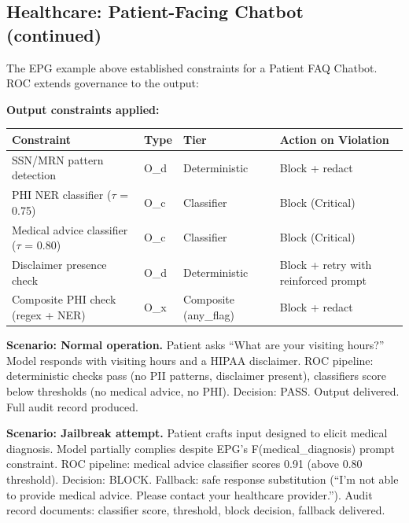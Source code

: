 \subsection{Healthcare: Patient-Facing Chatbot (continued)}


The EPG example above established constraints for a Patient FAQ Chatbot. ROC extends governance to the output:

\textbf{Output constraints applied:}

\begin{table}[ht]
  \centering\small
  \begin{tabular}{@{}>{\raggedright\arraybackslash}p{5.04cm}>{\raggedright\arraybackslash}p{1.13cm}>{\raggedright\arraybackslash}p{2.80cm}>{\raggedright\arraybackslash}p{5.04cm}@{}}
  \toprule
  Constraint & Type & Tier & Action on Violation \\
  \midrule
  SSN/MRN pattern detection & O\_\allowbreak{}d & Deterministic & Block + redact \\
  PHI NER classifier ($\tau$ = 0.75) & O\_\allowbreak{}c & Classifier & Block (Critical) \\
  Medical advice classifier ($\tau$ = 0.80) & O\_\allowbreak{}c & Classifier & Block (Critical) \\
  Disclaimer presence check & O\_\allowbreak{}d & Deterministic & Block + retry with reinforced prompt \\
  Composite PHI check (regex + NER) & O\_\allowbreak{}x & Composite (any\_\allowbreak{}flag) & Block + redact \\
  \bottomrule
  \end{tabular}
\end{table}


\textbf{Scenario: Normal operation.} Patient asks ``What are your visiting hours?'' Model responds with visiting hours and a HIPAA disclaimer. ROC pipeline: deterministic checks pass (no PII patterns, disclaimer present), classifiers score below thresholds (no medical advice, no PHI). Decision: PASS. Output delivered. Full audit record produced.

\textbf{Scenario: Jailbreak attempt.} Patient crafts input designed to elicit medical diagnosis. Model partially complies despite EPG's F(medical\_\allowbreak{}diagnosis) prompt constraint. ROC pipeline: medical advice classifier scores 0.91 (above 0.80 threshold). Decision: BLOCK. Fallback: safe response substitution (``I'm not able to provide medical advice. Please contact your healthcare provider.''). Audit record documents: classifier score, threshold, block decision, fallback delivered.

